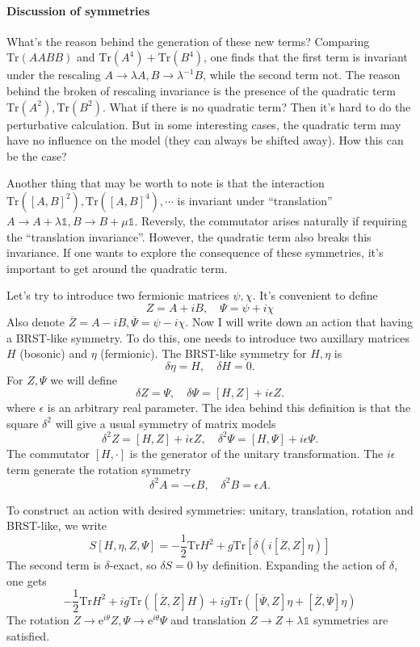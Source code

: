 \paragraph{Discussion of symmetries}

What's the reason behind the generation of these new terms?
Comparing $\mathrm{Tr}(AABB)$ and $\mathrm{Tr}(A^4) + \mathrm{Tr}(B^4)$, one finds that the first term is invariant under the rescaling $A\to\lambda A, B\to \lambda^{-1}B$, while the second term not.
The reason behind the broken of rescaling invariance is the presence of the quadratic term $\mathrm{Tr}(A^2),\mathrm{Tr}(B^2)$.
What if there is no quadratic term?
Then it's hard to do the perturbative calculation.
But in some interesting cases, the quadratic term may have no influence on the model (they can always be shifted away).
How this can be the case?

Another thing that may be worth to note is that the interaction $\mathrm{Tr}([A,B]^2),\mathrm{Tr}([A,B]^4),\cdots$ is invariant under ``translation'' $A\to A + \lambda \mathds{1},B\to B + \mu \mathds{1}$.
Reversly, the commutator arises naturally if requiring the ``translation invariance''.
However, the quadratic term also breaks this invariance.
If one wants to explore the consequence of these symmetries,
it's important to get around the quadratic term.

Let's try to introduce two fermionic matrices $\psi,\chi$.
It's convenient to define
\begin{equation}
	Z = A + i B,\quad \Psi = \psi + i\chi	
\end{equation}
Also denote $ \overline{Z} = A - iB,\overline{\Psi} = \psi - i\chi$.
Now I will write down an action that having a BRST-like symmetry.
To do this, one needs to introduce two auxillary matrices $H$ (bosonic) and $\eta$ (fermionic).
The BRST-like symmetry for $H,\eta$ is
\[
\delta \eta = H,\quad \delta H = 0
.\] 
For $Z,\Psi$ we will define
\[
	\delta Z = \Psi,\quad \delta\Psi = [H,Z] + i\epsilon Z
.\] 
where $\epsilon$ is an arbitrary real parameter.
The idea behind this definition is that the square $\delta^2$ will give a usual symmetry of matrix models
\[
	\delta^2 Z = [H,Z] + i\epsilon Z,\quad \delta^2\Psi = [H,\Psi]+ i\epsilon \Psi
.\] 
The commutator $[H,\cdot]$ is the generator of the unitary transformation.
The $i\epsilon$ term generate the rotation symmetry
\[
	\delta^2 A = -\epsilon B,\quad \delta^2 B = \epsilon A
.\] 

To construct an action with desired symmetries: unitary, translation, rotation and BRST-like, we write
\begin{equation}
	S[H,\eta,Z,\Psi] = - \frac{1}{2} \mathrm{Tr} H^2 + g\mathrm{Tr}\left[\delta (i [\overline{Z},Z]\eta)\right]
\end{equation}
The second term is $\delta$-exact, so $\delta S = 0$ by definition.
Expanding the action of $\delta$, one gets
\begin{equation}
	- \frac{1}{2} \mathrm{Tr} H^2 + i g \mathrm{Tr} ([\overline{Z},Z]H) + i g \mathrm{Tr} ([\overline{\Psi},Z]\eta + [\overline{Z},\Psi]\eta)
\end{equation}
The rotation $Z\to \mathrm{e}^{i\theta}Z,\Psi \to \mathrm{e}^{i\theta}\Psi$ and translation $Z\to Z + \lambda \mathds{1}$ symmetries are satisfied.

